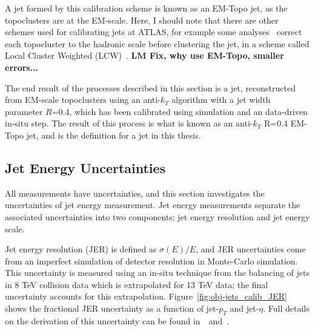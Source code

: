 A jet formed by this calibration scheme is known as an EM-Topo jet, as the topoclusters are at the EM-scale.
Here, I should note that there are other schemes used for calibrating jets at ATLAS,
for example some analyses~\cite{obj-VVjj} correct each topocluster to the hadronic scale
before clustering the jet, in a scheme called Local Cluster Weighted (LCW)~\cite{obj-jets_topo}.
\textbf{LM Fix, why use EM-Topo, smaller errors...}

The end result of the processes described in this section is a jet,
reconstructed from EM-scale topoclusters using an anti-$k_T$ algorithm with a jet width parameter $R$=0.4,
which has been calibrated using simulation and an data-driven in-situ step.
The result of this process is what is known as an anti-$k_T$ R=0.4 EM-Topo jet,
and is the definition for a jet in this thesis.

\subsection{Jet Energy Uncertainties}
\label{obj-jets_uncert}

All measurements have uncertainties, and this section investigates the uncertainties of jet energy measurement.
Jet energy measurements separate the associated uncertainties into two components;
jet energy resolution and jet energy scale.

Jet energy resolution (JER) is defined as $\sigma(E)/E$, and JER uncertainties
come from an imperfect simulation of detector resolution in Monte-Carlo simulation.
This uncertainty is measured using an in-situ technique from the balancing of jets in 8 TeV collision data
which is extrapolated for 13 TeV data; the final uncertainty accounts for this extrapolation.
Figure~\ref{fig:obj-jets_calib_JER} shows the fractional JER uncertainty as a function of jet-$p_T$ and jet-$\eta$.
Full details on the derivation of this uncertainty can be found in~\cite{obj-jets_calib_2015}~and~\cite{obj-jets_calib_JER_8TeV}.

